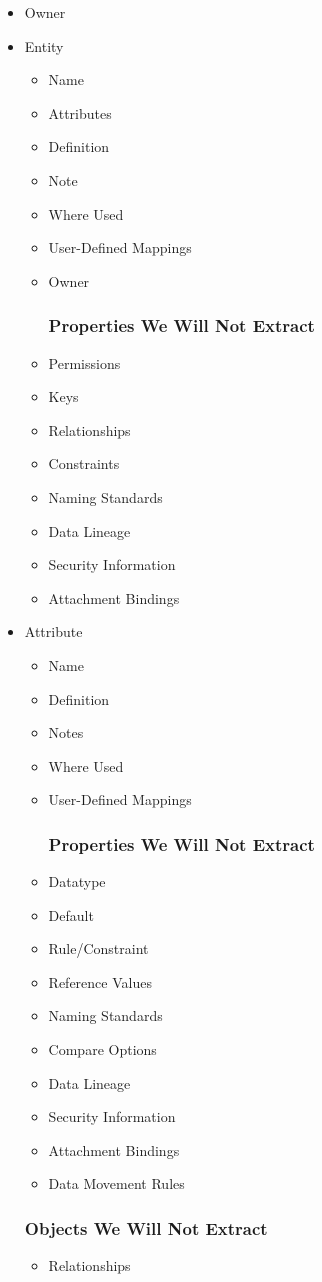 \documentclass[12pt,a4paper]{report}
\begin{document}
\begin{itemize}
	\item Owner
	\item Entity 
	\begin{itemize}
		\item Name 
		\item Attributes 
		\item Definition
		\item Note
		\item Where Used
		\item User-Defined Mappings
		\item Owner
		\subsubsection{Properties We Will Not Extract}
		\item Permissions 
		\item Keys 
		\item Relationships 
		\item Constraints 
		\item Naming Standards 
		\item Data Lineage
		\item Security Information
		\item Attachment Bindings
	\end{itemize}
	\item Attribute
	\begin{itemize}
		\item Name
		\item Definition
		\item Notes
		\item Where Used
		\item User-Defined Mappings
		\subsubsection{Properties We Will Not Extract}
		\item Datatype
		\item Default
		\item Rule/Constraint
		\item Reference Values
		\item Naming Standards
		\item Compare Options
		\item Data Lineage
		\item Security Information
		\item Attachment Bindings
		\item Data Movement Rules
	\end{itemize}
	\subsubsection{Objects We Will Not Extract}
	\begin{itemize}
		\item Relationships
	\end{itemize}
\end{itemize}
\end{document}
